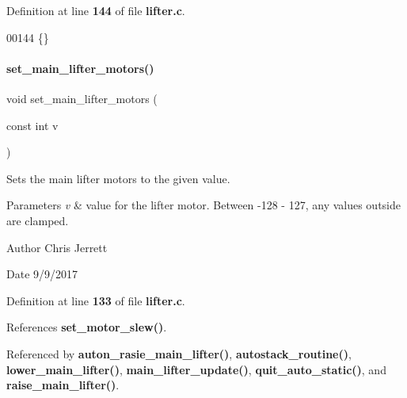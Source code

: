 Definition at line \textbf{ 144} of file \textbf{ lifter.\+c}.


\begin{DoxyCode}
00144 \{\}
\end{DoxyCode}
\mbox{\label{lifter_8c_ad00a195af30f246924d6e1a30095b882}} 
\paragraph{set\+\_\+main\+\_\+lifter\+\_\+motors()}
{\footnotesize\ttfamily void set\+\_\+main\+\_\+lifter\+\_\+motors (\begin{DoxyParamCaption}\item[{const int}]{v }\end{DoxyParamCaption})}



Sets the main lifter motors to the given value. 


\begin{DoxyParams}{Parameters}
{\em v} & value for the lifter motor. Between -\/128 -\/ 127, any values outside are clamped. \\
\hline
\end{DoxyParams}
\begin{DoxyAuthor}{Author}
Chris Jerrett 
\end{DoxyAuthor}
\begin{DoxyDate}{Date}
9/9/2017 
\end{DoxyDate}


Definition at line \textbf{ 133} of file \textbf{ lifter.\+c}.



References \textbf{ set\+\_\+motor\+\_\+slew()}.



Referenced by \textbf{ auton\+\_\+rasie\+\_\+main\+\_\+lifter()}, \textbf{ autostack\+\_\+routine()}, \textbf{ lower\+\_\+main\+\_\+lifter()}, \textbf{ main\+\_\+lifter\+\_\+update()}, \textbf{ quit\+\_\+auto\+\_\+static()}, and \textbf{ raise\+\_\+main\+\_\+lifter()}.



